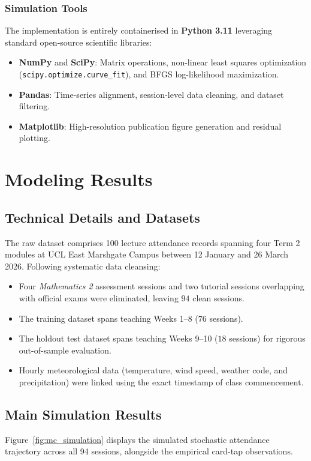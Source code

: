 \documentclass{article}
\begin{document}
\subsubsection{Simulation Tools}
The implementation is entirely containerised in \textbf{Python 3.11} leveraging standard open-source scientific libraries:
\begin{itemize}
    \item \textbf{NumPy} and \textbf{SciPy}: Matrix operations, non-linear least squares optimization (\texttt{scipy.optimize.curve\_fit}), and BFGS log-likelihood maximization.
    \item \textbf{Pandas}: Time-series alignment, session-level data cleaning, and dataset filtering.
    \item \textbf{Matplotlib}: High-resolution publication figure generation and residual plotting.
\end{itemize}


\section{Modeling Results}

\subsection{Technical Details and Datasets}
The raw dataset comprises 100 lecture attendance records spanning four Term 2 modules at UCL East Marshgate Campus between 12 January and 26 March 2026. Following systematic data cleansing:
\begin{itemize}
    \item Four \textit{Mathematics 2} assessment sessions and two tutorial sessions overlapping with official exams were eliminated, leaving $94$ clean sessions.
    \item The training dataset spans teaching Weeks 1--8 ($76$ sessions).
    \item The holdout test dataset spans teaching Weeks 9--10 ($18$ sessions) for rigorous out-of-sample evaluation.
    \item Hourly meteorological data (temperature, wind speed, weather code, and precipitation) were linked using the exact timestamp of class commencement.
\end{itemize}

\subsection{Main Simulation Results}
Figure~\ref{fig:mc_simulation} displays the simulated stochastic attendance trajectory across all 94 sessions, alongside the empirical card-tap observations.
\end{document}
